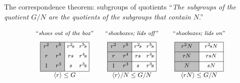 \documentclass[8pt]{beamer}
\begin{document}
\begin{frame}{The correspondence theorem: subgroups of quotients}
  ``\emph{The subgroups of the
    quotient $G/N$ are the quotients of the subgroups that contain $N$}.''
  

  \[
  \begin{tikzpicture}[scale=.61]
    \tikzstyle{every node}=[font=\footnotesize,anchor=south]
    \begin{scope}[shift={(11,0)}]
    \node at (2,2.7) {``\emph{shoeboxes; lids on}''};
      \draw[thin,fill=faded] (0,0) rectangle (2,2.4);
      \draw[thin] (2,2.4) to (4,2.4); 
      \draw[thin] (0,1.6) to (4,1.6);
      \draw[thin] (0,.8) to (4,.8);
      \draw[thin] (2,0) to (4,0);
      \draw[thin] (4,0) to (4,2.4);
      \node at (1,.13) {$N$};
      \node at (3,.13) {$sN$};
      \node at (1,.93) {$rN$};
      \node at (3,.93) {$rsN$};
      \node at (1,1.73) {$r^2N$};
      \node at (3,1.73) {$r^2\!sN$};
      \node at (2,-.8) {\small $\<rN\>\leq G/N$};
    \end{scope}
    \begin{scope}[shift={(5.5,0)}]
      \draw[thin,fill=faded] (0,0) rectangle (2,2.4);
      \node at (2,2.7) {``\emph{shoeboxes; lids off}''};
      \draw[thin] (2,2.4) to (4,2.4); 
      \draw[thin] (0,1.6) to (4,1.6);
      \draw[thin] (0,.8) to (4,.8);
      \draw[thin] (2,0) to (4,0);
      \draw[thin] (4,0) to (4,2.4);
      \node at (.5,.13) {$1$};
      \node at (1.5,.13) {$r^3$};
      \node at (2.5,.13) {$s$};
      \node at (3.5,.13) {$r^3\!s$};
      \node at (.5,.93) {$r$};
      \node at (1.5,.93) {$r^4$};
      \node at (2.5,.93) {$rs$};
      \node at (3.5,.93) {$r^4\!s$};
      \node at (.5,1.73) {$r^2$};
      \node at (1.5,1.73) {$r^5$};
      \node at (2.5,1.73) {$r^2\!s$};
      \node at (3.5,1.73) {$r^5\!s$};
      \node at (2,-.8) {\small $\<r\>/N\leq G/N$};
    \end{scope}
    \begin{scope}[shift={(0,0)}]
      \draw[thin,fill=faded] (0,0) rectangle (2,2.4);
      \node at (2,2.7) {``\emph{shoes out of the box}''};
      \draw[thin] (2,2.4) to (4,2.4); 
      \draw[thin] (2,0) to (4,0);
      \draw[thin] (4,0) to (4,2.4);
      \node at (.5,.13) {$1$};
      \node at (1.5,.13) {$r^3$};
      \node at (2.5,.13) {$s$};
      \node at (3.5,.13) {$r^3\!s$};
      \node at (.5,.93) {$r$};
      \node at (1.5,.93) {$r^4$};
      \node at (2.5,.93) {$rs$};
      \node at (3.5,.93) {$r^4\!s$};
      \node at (.5,1.73) {$r^2$};
      \node at (1.5,1.73) {$r^5$};
      \node at (2.5,1.73) {$r^2\!s$};
      \node at (3.5,1.73) {$r^5\!s$};
      \node at (2,-.8) {\small $\<r\>\leq G$};
    \end{scope}
  \end{tikzpicture}
  \]
  
\end{frame}
\end{document}
